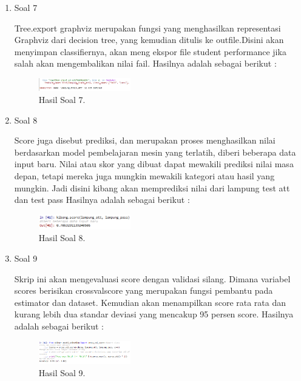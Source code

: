 \begin{enumerate}
	\item Soal 7
	\hfill\break
	
	Tree.export graphviz merupakan fungsi yang menghasilkan representasi Graphviz dari decision tree, yang kemudian ditulis ke outfile.Disini akan menyimpan classifiernya, akan meng ekspor file student performance jika salah akan mengembalikan nilai fail. Hasilnya adalah sebagai berikut :
	\begin{figure}[H]
	\centering
		\includegraphics[width=4cm]{figures/1174008/2/hasilsoal7.PNG}
		\caption{Hasil Soal 7.}
	\end{figure}

	\item Soal 8
	\hfill\break
	
	Score juga disebut prediksi, dan merupakan proses menghasilkan nilai berdasarkan model pembelajaran mesin yang terlatih, diberi beberapa data input baru. Nilai atau skor yang dibuat dapat mewakili prediksi nilai masa depan, tetapi mereka juga mungkin mewakili kategori atau hasil yang mungkin. Jadi disini kibang akan memprediksi nilai dari lampung test att dan test pass Hasilnya adalah sebagai berikut :
	\begin{figure}[H]
	\centering
		\includegraphics[width=4cm]{figures/1174008/2/hasilsoal8.PNG}
		\caption{Hasil Soal 8.}
	\end{figure}

	\item Soal 9
	\hfill\break
	
	Skrip ini akan mengevaluasi score dengan validasi silang. Dimana variabel scores berisikan crossvalscore yang merupakan fungsi pembantu pada estimator dan dataset. Kemudian akan menampilkan score rata rata dan kurang lebih dua standar deviasi yang mencakup 95 persen score. Hasilnya adalah sebagai berikut :
	\begin{figure}[H]
	\centering
		\includegraphics[width=4cm]{figures/1174008/2/hasilsoal9.PNG}
		\caption{Hasil Soal 9.}
	\end{figure}


\end{enumerate}
